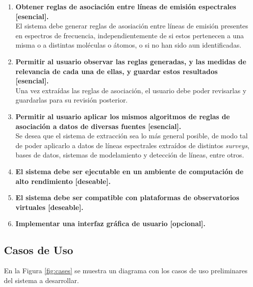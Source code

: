 \begin{enumerate}
	\item \textbf{Obtener reglas de asociación entre líneas de emisión espectrales [esencial].} \\
	El sistema debe generar reglas de asosiación entre líneas de emisión presentes en espectros de frecuencia, independientemente de si estos pertenecen a una misma o a distintas moléculas o átomos, o si no han sido aun identificadas.
	\item \textbf{Permitir al usuario observar las reglas generadas, y las medidas de relevancia de cada una de ellas, y guardar estos resultados [esencial].} \\
	Una vez extraídas las reglas de asociación, el usuario debe poder revisarlas y guardarlas para su revisión posterior.
	\item \textbf{Permitir al usuario aplicar los mismos algoritmos de reglas de asociación a datos de diversas fuentes [esencial].} \\
	Se desea que el sistema de extracción sea lo más general posible, de modo tal de poder aplicarlo a datos de líneas espectrales extraídos de distintos \textit{surveys}, bases de datos, sistemas de modelamiento y detección de líneas, entre otros.
	\item \textbf{El sistema debe ser ejecutable en un ambiente de computación de alto rendimiento [deseable].}
	\item \textbf{El sistema debe ser compatible con plataformas de observatorios virtuales [deseable].} 
	\item \textbf{Implementar una interfaz gráfica de usuario [opcional].}
\end{enumerate}

\subsection{Casos de Uso}

En la Figura \ref{fig:cases} se muestra un diagrama con los casos de uso preliminares del sistema a desarrollar.


